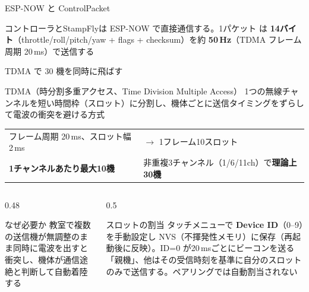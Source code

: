 \begin{frame}{ESP-NOW と ControlPacket}
  \begin{center}
  \end{center}

  \vspace{0.3em}

  {\small コントローラとStampFlyは ESP-NOW で直接通信する。1パケット  は \textbf{14バイト}（throttle/roll/pitch/yaw + flags + checksum）を約 \textbf{50\,Hz}（TDMA フレーム周期 20\,ms）で送信する}
\end{frame}

\begin{frame}{TDMA で 30 機を同時に飛ばす}
  \begin{block}{TDMA（時分割多重アクセス、Time Division Multiple Access）}
    \footnotesize 1つの無線チャンネルを短い時間枠（スロット）に分割し、機体ごとに送信タイミングをずらして電波の衝突を避ける方式
  \end{block}

  \vspace{0.2em}

  \begin{table}
    \centering\footnotesize
    \begin{tabular}{ll}
      \hline
      フレーム周期 20\,ms、スロット幅 2\,ms & $\to$ 1フレーム10スロット \\
      \textbf{1チャンネルあたり最大10機} & 非重複3チャンネル（1/6/11ch）で\textbf{理論上30機} \\
      \hline
    \end{tabular}
  \end{table}

  \vspace{0.1em}

  \begin{columns}[T]
    \begin{column}{0.48\textwidth}
      \begin{alertblock}{なぜ必要か}
        \scriptsize 教室で複数の送信機が無調整のまま同時に電波を出すと衝突し、機体が通信途絶と判断して自動着陸する
      \end{alertblock}
    \end{column}
    \begin{column}{0.5\textwidth}
      \begin{exampleblock}{スロットの割当}
        \scriptsize タッチメニューで \textbf{Device ID}（0--9）を手動設定し NVS（不揮発性メモリ）に保存（再起動後に反映）。ID=0 が20\,msごとにビーコンを送る「親機」、他はその受信時刻を基準に自分のスロットのみで送信する。ペアリングでは自動割当されない
      \end{exampleblock}
    \end{column}
  \end{columns}

\end{frame}

